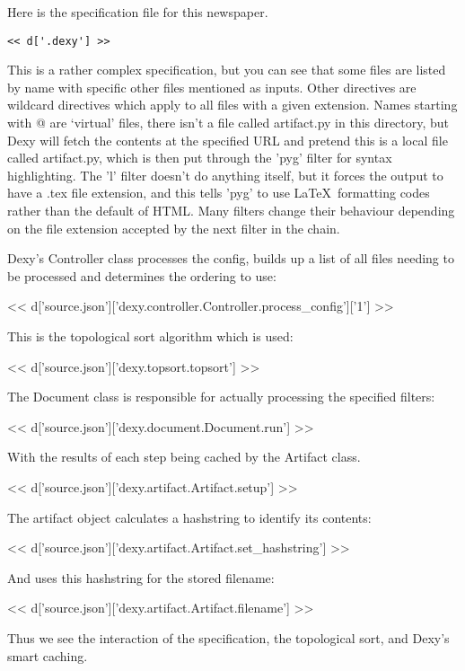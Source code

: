 \documentclass[custom, plainsections]{sciposter}
\begin{document}
\begin{multicols*}{2}
Here is the specification file for this newspaper.

\tiny
\begin{Verbatim}
<< d['.dexy'] >>
\end{Verbatim}
\small

This is a rather complex specification, but you can see that some files are listed by name with specific other files mentioned as inputs. Other directives are wildcard directives which apply to all files with a given extension. Names starting with @ are `virtual' files, there isn't a file called artifact.py in this directory, but Dexy will fetch the contents at the specified URL and pretend this is a local file called artifact.py, which is then put through the 'pyg' filter for syntax highlighting. The 'l' filter doesn't do anything itself, but it forces the output to have a .tex file extension, and this tells 'pyg' to use \LaTeX~formatting codes rather than the default of HTML. Many filters change their behaviour depending on the file extension accepted by the next filter in the chain.

Dexy's Controller class processes the config, builds up a list of all files needing to be processed and determines the ordering to use:

\tiny
<< d['source.json']['dexy.controller.Controller.process_config']['1'] >>
\small

This is the topological sort algorithm which is used:

\tiny
<< d['source.json']['dexy.topsort.topsort'] >>
\small

The Document class is responsible for actually processing the specified filters:

\tiny
<< d['source.json']['dexy.document.Document.run'] >>
\small

With the results of each step being cached by the Artifact class.

\tiny
<< d['source.json']['dexy.artifact.Artifact.setup'] >>
\small

The artifact object calculates a hashstring to identify its contents:

\tiny
<< d['source.json']['dexy.artifact.Artifact.set_hashstring'] >>
\small

And uses this hashstring for the stored filename:

\tiny
<< d['source.json']['dexy.artifact.Artifact.filename'] >>
\small

Thus we see the interaction of the specification, the topological sort, and Dexy's smart caching.


\end{multicols*}
\end{document}
